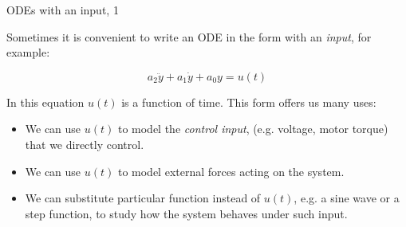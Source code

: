\documentclass{beamer}
\begin{document}
\begin{frame}{ODEs with an input, 1}
	\begin{flushleft}
		
		Sometimes it is convenient to write an ODE in the form with an \emph{input}, for example:
		
		\begin{equation}
			a_2 \ddot{y} + a_1 \dot{y} + 
			a_0 y = u(t)
		\end{equation}
		
		In this equation $u(t)$ is a function of time. This form offers us many uses:
		
		\begin{itemize}
			\item We can use $u(t)$ to model the \emph{control input}, (e.g. voltage, motor torque) that we directly control.
			
			\item We can use $u(t)$ to model external forces acting on the system.
			
			\item We can substitute particular function instead of $u(t)$, e.g. a sine wave or a step function, to study how the system behaves under such input.
		\end{itemize}
		
	\end{flushleft}
\end{frame}
\end{document}
